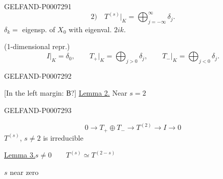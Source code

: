 \begin{GelfandAdjacentEvidence}{GELFAND-P000729}{1}
\[
2)\quad T^{(s)}\big|_K=\bigoplus_{j=-\infty}^{\infty}\delta_j.
\]
\(\delta_k={}\) eigensp. of \(X_0\) with eigenval. \(2ik\).

(1-dimensional repr.)
\[
I\big|_K=\delta_0,\qquad
T_+\big|_K=\bigoplus_{j>0}\delta_j,\qquad
T_-\big|_K=\bigoplus_{j<0}\delta_j.
\]
\end{GelfandAdjacentEvidence}
\begin{GelfandAdjacentEvidence}{GELFAND-P000729}{2}


[In the left margin: В?] \underline{Lemma 2.} Near \(s=2\)
\end{GelfandAdjacentEvidence}
\begin{GelfandAdjacentEvidence}{GELFAND-P000729}{3}

\[
0\longrightarrow T_+\oplus T_-\longrightarrow T^{(2)}\longrightarrow I\longrightarrow0
\]
\(T^{(s)}\), \(s\ne2\) is irreducible

\underline{Lemma 3.}\quad \(s\ne0\qquad T^{(s)}\simeq T^{(2-s)}\)

\(s\) near zero
\end{GelfandAdjacentEvidence}
